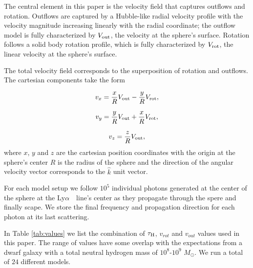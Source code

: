 \documentclass[a4paper,fleqn,usenatbib]{mnras}
\newcommand{\lya}{\ifmmode{{\rm Ly}\alpha}\else Ly$\alpha$\ \fi}
\begin{document}
The central element in this paper is the velocity field that captures
outflows and rotation.
Outflows are captured by a Hubble-like radial velocity profile with
the velocity magnitude increasing linearly with the radial
coordinate; the outflow model is fully characterized by $V_{\rm out}$, the
velocity at the sphere's surface.
Rotation follows a solid body rotation profile, which is fully
characterized by $V_{\rm rot}$, the linear velocity at the sphere's surface.

The total velocity field corresponds to the superposition of rotation and
outflows.
The cartesian components take the form

\begin{equation}
	v_{x}=\frac{x}{R}V_{\rm out}-\frac{y}{R}V_{\rm rot} ,
	\label{eq:vx}
\end{equation}

\begin{equation}
	v_{y}=\frac{y}{R}V_{\rm out}+\frac{x}{R}V_{\rm rot} ,
	\label{eq:vy}
\end{equation}

\begin{equation}
	v_{z}=\frac{z}{R}V_{\rm out},
	\label{eq:vz}
\end{equation}
%
where $x$, $y$ and $z$ are the cartesian position coordinates with the
origin at the sphere's center $R$ is the radius of the sphere and the
direction of the angular velocity vector corresponds to the $\hat{k}$
unit vector. 

For each model setup we follow $10^5$ individual photons generated at
the center of the sphere at the \lya\ line's center as they propagate
through the spere and finally scape.
We store the final frequency and propagation direction for each photon
at its last scattering.  



In Table \ref{tab:values} we list the combination of $\tau_{\rm{H}}$,
$v_{rot}$ and $v_{out}$ values used in this paper.
The range of values have some overlap with the expectations from a dwarf
galaxy with a total neutral hydrogen mass of $10^8$-$10^9$ $M_{\odot}$.
We run a total of $24$ different models.
\end{document}
